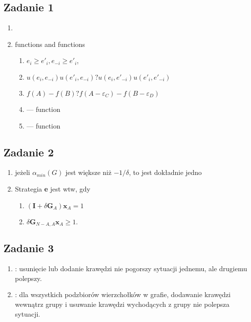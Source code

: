 \subsection{Zadanie 1}
\begin{enumerate}
    \item
    \item
         functions and  functions
        \begin{enumerate}
            \item
                $e_i \geq e'_i, e_{-i} \geq e'_i$,
            \item
                $ u(e_i, e_{-i}) u(e'_i, e_{-i}) ?  u(e_i, e'_{-i}) u(e'_i, e'_{-i}) $
            \item
                $ f(A) - f(B) ?  f(A - \varepsilon_C) - f(B - \varepsilon_D) $
            \item
                --- function
            \item
                --- function
        \end{enumerate}
\end{enumerate}

\subsection{Zadanie 2}
\begin{enumerate}
  \item
    jeżeli $\alpha_{min}(G)$ jest większe niż $-1/\delta$, to jest dokładnie jedno
  \item Strategia \textbf{e} jest  wtw, gdy
    \begin{enumerate}
      \item $ (\textbf{I} + \delta \textbf{G}_{A})\textbf{x}_{A} = 1$
      \item $ \delta\textbf{G}_{N-A,A}\textbf{x}_A \geq 1.$
    \end{enumerate}
\end{enumerate}

\subsection{Zadanie 3}
\begin{enumerate}
 \item
     : usunięcie lub dodanie krawędzi nie pogorszy
        sytuacji jednemu, ale drugiemu polepszy.
 \item
     : dla wszystkich podzbiorów wierzchołków w
        grafie, dodawanie krawędzi wewnątrz grupy i usuwanie krawędzi
        wychodących z grupy nie polepsza sytuacji.
\end{enumerate}
